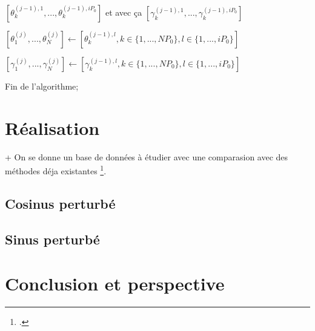 \documentclass[french,12pt]{article}
\begin{document}
\begin{algorithm}
{{            $\left[ \theta_k^{(j-1), 1}, ..., \theta_k^{(j-1), iP_0} \right]$ et avec ça $\left[\gamma_k^{(j-1), 1},..., \gamma_k^{(j-1), iP_0} \right]$
        }

        $[\theta_1^{(j)},..., \theta_N^{(j)}] \gets [\theta_k^{(j-1), l}, k \in \{1, ..., NP_0\}, l \in \{1, ..., iP_0\}]$

        $[\gamma_1^{(j)},..., \gamma_N^{(j)}] \gets [\gamma_k^{(j-1), l}, k \in \{1, ..., NP_0\}, l \in \{1, ..., iP_0\}]$



        {
            Fin de l'algorithme;
        }

    }




\end{algorithm}


\pagebreak

\section{Réalisation}

+ On se donne un base de données à étudier
avec une comparasion avec des méthodes déja existantes \footcite{matsumoto_tracking_2013}.

\subsection{Cosinus perturbé}

\subsection{Sinus perturbé}

\section{Conclusion et perspective}

\pagebreak
\printbibliography
\end{document}

